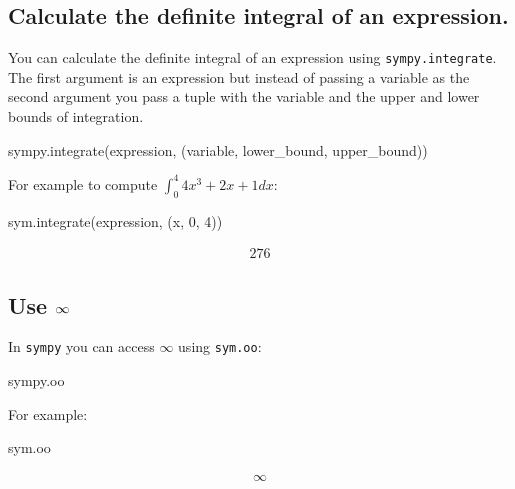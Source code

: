 \subsection{Calculate the definite integral of an expression.}

You can calculate the definite integral of an expression using
\texttt{sympy.integrate}. The first argument is an expression but instead of passing a
variable as the second argument you pass a tuple with the variable and the upper
and lower bounds of integration.


\begin{api}
sympy.integrate(expression, (variable, lower_bound, upper_bound))
\end{api}



For example to compute \(\int_0^4 4x^3 + 2x + 1 dx\):




\begin{pyin}
sym.integrate(expression, (x, 0, 4))
\end{pyin}




\begin{equation*}
\begin{split}\displaystyle 276\end{split}
\end{equation*}




\subsection{Use \(\infty\protect\)}
\label{\detokenize{tools-for-mathematics/03-calculus/how/main:use-infty}}

In \texttt{sympy} you can access \(\infty\) using \texttt{sym.oo}:


\begin{api}
sympy.oo
\end{api}



For example:




\begin{pyin}
sym.oo
\end{pyin}




\begin{equation*}
\begin{split}\displaystyle \infty\end{split}
\end{equation*}




